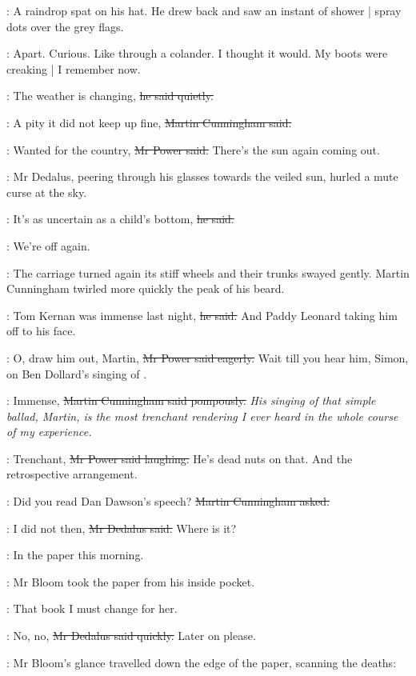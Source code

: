 :
A raindrop spat on his hat.
He drew back and saw an instant of shower |
spray dots over the grey flags.

\BloomInt:
Apart.
Curious.
Like through a colander.
I thought it would.
My boots were creaking |
I remember now.

\Bloom:
The weather is changing,
\sout{he said quietly.}

\cunningham:
A pity it did not keep up fine,
\sout{Martin Cunningham said.}

\power:
Wanted for the country,
\sout{Mr Power said.}
There's the sun again coming out.

:
Mr Dedalus, peering through his glasses towards the veiled sun,
hurled a mute curse at the sky.

\simon:
It's as uncertain as a child's bottom,
\sout{he said.}

\cunningham:
We're off again.

:
The carriage turned again its stiff wheels
and their trunks swayed gently.
Martin Cunningham twirled more quickly the peak of his beard.

\cunningham:
Tom Kernan was immense last night,
\sout{he said.}
And Paddy Leonard taking him off to his face.

\power:
O, draw him out, Martin,
\sout{Mr Power said eagerly.}
Wait till you hear him, Simon,
on Ben Dollard's singing of .

\cunningham:
Immense,
\sout{Martin Cunningham said pompously.}
\emph{His singing of that simple ballad, Martin,
is the most trenchant rendering
I ever heard in the whole course of my experience.}

\power:
Trenchant,
\sout{Mr Power said laughing.}
He's dead nuts on that.
And the retrospective arrangement.%

\cunningham:
Did you read Dan Dawson's speech?
\sout{Martin Cunningham asked.}

\simon:
I did not then,
\sout{Mr Dedalus said.}
Where is it?

\cunningham:
In the paper this morning.

:
Mr Bloom took the paper from his inside pocket.

\BloomInt:
That book I must change for her.

\simon:
No, no,
\sout{Mr Dedalus said quickly.}
Later on please.

:
Mr Bloom's glance travelled down the edge of the paper,
scanning the deaths:


